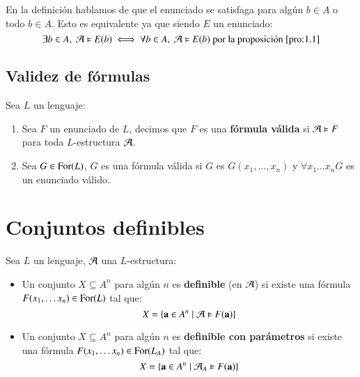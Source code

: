 \begin{obs}
    En la definición hablamos de que el enunciado se satisfaga para algún $b \in A$ o todo $b \in A$. Esto es equivalente ya que siendo $E$ un enunciado:
    $$
        \exists b \in A,\ \mathcal{A} \vDash E(b) \iff \forall b \in A,\ \mathcal{A} \vDash E(b) \text{ por la proposición } \ref{pro:1.1}
    $$
\end{obs}

\subsection{Validez de fórmulas}

\begin{dfn}
    Sea $L$ un lenguaje:
    \begin{enumerate}
        \item Sea $F$ un enunciado de $L$, decimos que $F$ es una \textbf{fórmula válida} si $\mathcal{A} \vDash F$ para toda $L$-estructura $\mathcal{A}$.
        \item Sea $G \in \mathrm{For}(L)$, $G$ es una fórmula válida si $G$ es $G(x_1, \ldots, x_n)$ y $\forall x_1 \ldots x_n G$ es un enunciado válido.
    \end{enumerate}
\end{dfn}

\section{Conjuntos definibles}

\begin{dfn}
    Sea $L$ un lenguaje, $\mathcal{A}$ una $L$-estructura:
    \begin{itemize}
        \item Un conjunto $X \subseteq A^n$ para algún $n$ es \textbf{definible} (en $\mathcal{A}$) si existe una fórmula $F(x_1, \ldots x_n) \in \mathrm{For}(L)$ tal que:
        $$
            X = \left\{\mathbf{a} \in A^n \mid \mathcal{A} \vDash F(\mathbf{a})\right\}
        $$
        \item Un conjunto $X \subseteq A^n$ para algún $n$ es \textbf{definible con parámetros} si existe una fórmula $F(x_1, \ldots x_n) \in \mathrm{For}(L_A)$ tal que:
        $$
            X = \left\{\mathbf{a} \in A^n \mid \mathcal{A}_A \vDash F(\mathbf{a})\right\}
        $$
    \end{itemize}
\end{dfn}

